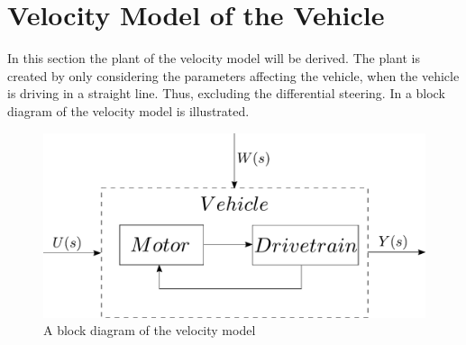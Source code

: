 \section{Velocity Model of the Vehicle}
In this section the plant of the velocity model will be derived. The plant is created by only considering the parameters affecting the vehicle, when the vehicle is driving in a straight line. Thus, excluding the differential steering. In  a block diagram of the velocity model is illustrated.   

\begin{figure}[H]
	\centering
	\includegraphics[scale=0.6]{figures/plantopen.pdf}
	\caption{A block diagram of the velocity model}
	\label{fig:Velocitymodelplantopen}
\end{figure}
